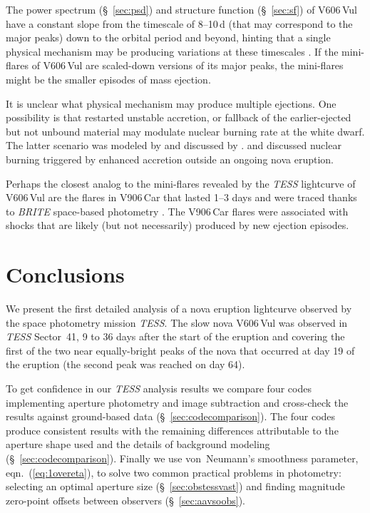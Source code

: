 \documentclass[twocolumn]{aastex631}
\newcommand{\nova}{V606\,Vul}
\begin{document}
The power spectrum (\S~\ref{sec:psd}) and structure function (\S~\ref{sec:sf})
of \nova{} 
have a constant slope from the timescale of 8--10\,d (that may correspond to
the major peaks) down to the orbital period and beyond, hinting that a single physical mechanism
may be producing variations at these timescales \citep[the argument previously invoked by][]{2023MNRAS.524.3146S}.
If the mini-flares of \nova{} are scaled-down versions of its major peaks, 
the mini-flares might be the smaller episodes of mass ejection.

It is unclear what physical mechanism may produce multiple ejections.
One possibility is that restarted unstable accretion, or fallback of 
the earlier-ejected but not unbound material may modulate nuclear burning rate
at the white dwarf. The latter scenario was modeled by
\cite{1995PASP..107.1201P,2014MNRAS.437.1962H} and discussed by \cite{2009ApJ...701L.119P}.
\cite{2006ApJ...636.1002S} and \cite{2022ApJ...939....6A} discussed
nuclear burning triggered by enhanced accretion outside an ongoing nova eruption.

Perhaps the closest analog to the mini-flares revealed by the {\em TESS}
lightcurve of \nova{} are the flares in V906\,Car that lasted 1--3 days and
were traced thanks to {\em BRITE} space-based photometry \citep{2020NatAs...4..776A}.
The V906\,Car flares were associated with shocks that are likely 
(but not necessarily) produced by new ejection episodes.



\section{Conclusions}
\label{sec:conclusions}

We present the first detailed analysis of a nova eruption lightcurve observed by the space photometry mission {\em TESS}. 
The slow nova \nova{} was observed in {\em TESS} Sector~41, 9 to 36 days
after the start of the eruption and covering the first of the two near equally-bright peaks of the nova 
that occurred at day 19 of the eruption (the second peak was reached on day 64). 

To get confidence in our {\em TESS} analysis results we compare four
codes implementing aperture photometry and image subtraction 
and cross-check the results against ground-based data (\S~\ref{sec:codecomparison}). 
The four codes produce consistent results with the remaining differences attributable to the aperture shape used and the details of background modeling 
(\S~\ref{sec:codecomparison}).
%
Finally we use von~Neumann's smoothness parameter, eqn.~(\ref{eq:1overeta}),
to solve two common practical problems in photometry: 
selecting an optimal aperture size (\S~\ref{sec:obstessvast}) and 
finding magnitude zero-point offsets between observers (\S~\ref{sec:aavsoobs}).
\end{document}
